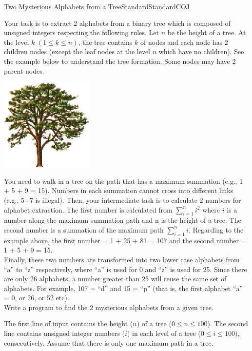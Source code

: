 \begin{problema}{Two Mysterious Alphabets from a Tree}{Standard}{Standard}{COJ}

Your task is to extract 2 alphabets from a binary tree which is composed of unsigned integers respecting the following rules. Let $n$ be the height of a tree. At the level $k$ $(1 \leq k \leq n)$, the tree contains $k$ of nodes and each node has 2 children nodes (except the leaf nodes at the level $n$ which have no children). See the example below to understand the tree formation. Some nodes may have 2 parent nodes. \\

\begin{center}
 \includegraphics{graficos/tree}
\end{center}

You need to walk in a tree on the path that has a maximum summation (e.g., 1 + 5 + 9 = 15). Numbers in each summation cannot cross into different links (e.g., 5+7 is illegal). Then, your intermediate task is to calculate 2 numbers for alphabet extraction. The first number is calculated from $\sum_{i=1}^{n}{i^2}$ where $i$ is a number along the maximum summation path and n is the height of a tree. The second number is a summation of the maximum path $\sum_{i=1}^{n}{i}$. Regarding to the example above, the first number = 1 + 25 + 81 = 107 and the second number = 1 + 5 + 9 = 15. \\

Finally, these two numbers are transformed into two lower case alphabets from ``a'' to ``z'' respectively, where ``a'' is used for 0 and ``z'' is used for 25. Since there are only 26 alphabets, a number greater than 25 will reuse the same set of alphabets. For example, 107 = ``d'' and 15 = ``p'' (that is, the first alphabet ``a'' = 0, or 26, or 52 etc). \\

Write a program to find the 2 mysterious alphabets from a given tree.

\InputFile

The first line of input contains the height ($n$) of a tree ($0 \le n \le 100$). The second line contains unsigned integer numbers ($i$) in each level of a tree ($0 \le i \le 100$), consecutively. Assume that there is only one maximum path in a tree. \\



\end{problema}

